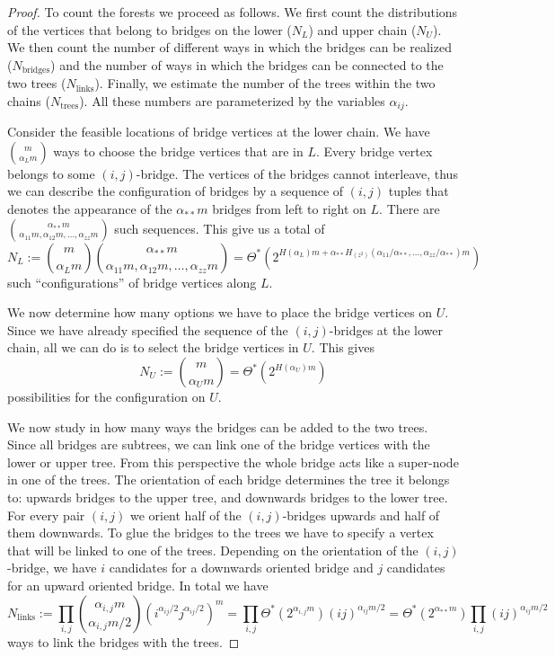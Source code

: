\documentclass[11pt]{article}
\begin{document}
\begin{proof}
To count the forests we proceed as follows. We first count the distributions of the
vertices that belong to bridges on the lower ($N_L$) and upper chain ($N_U$).
We then count the number of different ways in which the bridges can be realized ($N_\text{bridges}$)
and the number of ways in which the bridges can be connected to the two trees ($N_{\text{links}}$).
Finally, we estimate the number of the trees within the two chains
($N_{\text{trees}}$). All these numbers are parameterized by the
variables $\alpha_{ij}$.

Consider the feasible locations of bridge vertices at the
lower chain. We have ${m \choose \alpha_L m}$ ways to choose the bridge vertices
that are in $L$. Every bridge vertex belongs to some $(i,j)$-bridge. The vertices
of the bridges cannot interleave, thus we can describe the
configuration of bridges by a sequence of $(i,j)$ tuples that denotes
the appearance of the $\alpha_{**}m$ bridges from left to right on $L$.
There are ${ \alpha_{**} m \choose \alpha_{11}m , \alpha_{12}m ,
\dotsc , \alpha_{zz}m}$ such sequences. This give us a total of
\[N_L:={m \choose \alpha_L m} { \alpha_{**} m \choose \alpha_{11} m,
\alpha_{12}m, \dotsc ,
\alpha_{zz}m}=\Theta^*\left(2^{H(\alpha_L)m+
\alpha_{**}H_{\left(z^2\right)}(\alpha_{11}/\alpha_{**},\dotsc,\alpha_{zz}/\alpha_{**})m}\right)\]
such ``configurations'' of bridge vertices along $L$.

We now determine how many options we have to place the bridge
vertices on $U$. Since we have already specified the sequence of
the $(i,j)$-bridges at the lower chain, all we can do is to select the bridge
vertices in $U$. This gives
\[N_U:={m \choose \alpha_U m}=\Theta^*\left(2^{H(\alpha_U) m}\right)\]
possibilities for the configuration on $U$.

We now study in how many ways the bridges can be added to the two
trees. Since all bridges are subtrees, we can link one of the bridge
vertices with the lower or upper tree. From this perspective the whole
bridge acts like a super-node in one of the trees. The orientation
of each bridge determines the tree it belongs to: upwards
bridges to the upper tree, and downwards bridges to the lower tree.
For every pair $(i,j)$ we orient half of the $(i,j)$-bridges upwards
and half of them downwards. To glue the bridges to the trees we have
to specify a vertex that will be linked to one of the trees.
Depending on the orientation of the $(i,j)$-bridge, we have $i$
candidates for a downwards oriented bridge and $j$ candidates
for an upward oriented bridge. In total we have
\[N_{\text{links}}:=
\prod_{i,j} \binom{\alpha_{i,j}m}{\alpha_{i,j}m/2} \left( i^{\alpha_{ij} /2} j^{\alpha_{ij} /2} \right)^m
=\prod_{i,j} \Theta^*\left(2^{\alpha_{i,j}m}\right) \left( ij\right)^{\alpha_{ij}m/2}
=\Theta^*\left(2^{\alpha_{**}m}\right)\prod_{i,j} \left( ij\right)^{\alpha_{ij}m/2}
 \]
ways to link the bridges with the trees.


\end{proof}
\end{document}
